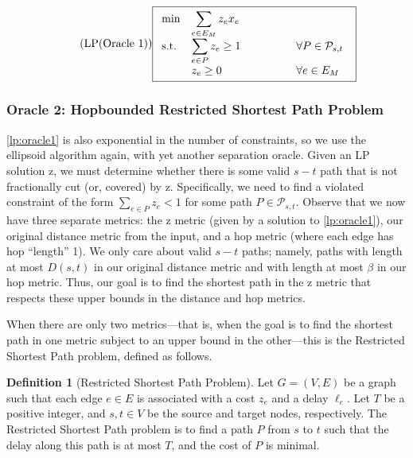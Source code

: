 \documentclass{article}
\theoremstyle{definition}
\newtheorem{definition}{Definition}
\theoremstyle{remark}
\begin{document}
\begin{equation} \label{lp:oracle1} \tag{LP(Oracle 1)}
\fbox{$
\begin{array}{lll}
\min & \displaystyle \sum_{e \in E_M} z_e x_e \\
\mathrm{s.t.} & \displaystyle \sum_{e \in P} z_e \geq 1 \qquad \qquad & \forall P \in \mathcal{P}_{s,t} \\
& \displaystyle z_e \geq 0 & \forall e \in E_M
\end{array}
$
}
\end{equation}

\subsubsection{Oracle 2: Hopbounded Restricted Shortest Path Problem}
\ref{lp:oracle1} is also exponential in the number of constraints, so we use the ellipsoid algorithm again, with yet another separation oracle. Given an LP solution $\bm{\mathrm{z}}$, we must determine whether there is some valid $s-t$ path that is not fractionally cut (or, covered) by $\bm{\mathrm{z}}$. Specifically, we need to find a violated constraint of the form $\sum_{e \in P} z_e < 1$ for some path $P \in \mathcal{P}_{s,t}$. Observe that we now have three separate metrics: the $\bm{\mathrm{z}}$ metric (given by a solution to \ref{lp:oracle1}), our original distance metric from the input, and a hop metric (where each edge has hop ``length'' 1). We only care about valid $s-t$ paths; namely, paths with length at most $D(s,t)$ in our original distance metric and with length at most $\beta$ in our hop metric. Thus, our goal is to find the shortest path in the $\bm{\mathrm{z}}$ metric that respects these upper bounds in the distance and hop metrics. 

When there are only two metrics---that is, when the goal is to find the shortest path in one metric subject to an upper bound in the other---this is the Restricted Shortest Path problem, defined as follows.

\begin{definition} [Restricted Shortest Path Problem]
    Let $G = (V,E)$ be a graph such that each edge $e \in E$ is associated with a cost $z_e$ and a delay $\ell_e$. Let $T$ be a positive integer, and $s,t \in V$ be the source and target nodes, respectively. The Restricted Shortest Path problem is to find a path $P$ from $s$ to $t$ such that the delay along this path is at most $T$, and the cost of $P$ is minimal.
\end{definition}
\end{document}
